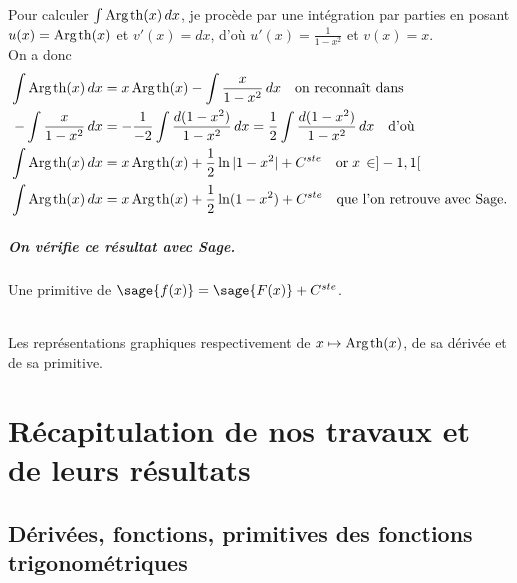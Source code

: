 \documentclass[a4paper,landscape,17pt]{extreport} %
\renewcommand{\tanh}{\mathop{\mathrm{th}}}
\renewcommand{\arg}{\mathop{\mathrm{Arg}}}
\begin{document}
Pour calculer $\int \arg\mspace{-1mu}\tanh(x) \, dx$, je procède par une intégration par parties en posant $u(x) = \arg\mspace{-1mu}\tanh(x)$ et $v'(x) = dx$, d'où $u'(x) = \frac{1}{ 1 - x^2 }$ et $ v(x) = x $. \\
On a donc
\begin{align*}
\int \arg\mspace{-1mu}\tanh(x) \, dx & = x \arg\mspace{-1mu}\tanh(x) - \int  \frac{x}{ 1 - x^2 } \, dx \quad \textrm{on reconnaît dans}\\
- \int  \frac{x}{ 1 - x^2 } \, dx & = -\frac{1}{-2} \int  \frac{d(1 - x^2 )}{ 1 - x^2 } \, dx = \frac{1}{2} \int  \frac{d(1 - x^2 )}{ 1 - x^2 } \, dx  \quad \textrm{d'où}\\
\int \arg\mspace{-1mu}\tanh(x) \, dx & = x \arg\mspace{-1mu}\tanh(x) + \frac{1}{2} \ln|1- x^2| + C^{ste} \quad \textrm{or} \; x \, \in ]-1, 1[ \\
\int \arg\mspace{-1mu}\tanh(x) \, dx & = x \arg\mspace{-1mu}\tanh(x) + \frac{1}{2} \ln(1- x^2) + C^{ste} \quad \textrm{que l'on retrouve avec Sage.}
\end{align*}

\paragraph{On vérifie ce résultat avec Sage.}

Une primitive de $\sage{f(x)} = \sage{F(x)} + C^{ste} $.

\begin{center}
\\
Les représentations graphiques respectivement de $x \mapsto \arg\mspace{-1mu}\tanh(x)$, de sa dérivée et de sa primitive.
\end{center}


\chapter{Récapitulation de nos travaux et de leurs résultats}

\section{Dérivées, fonctions, primitives des fonctions trigonométriques}
\end{document}
